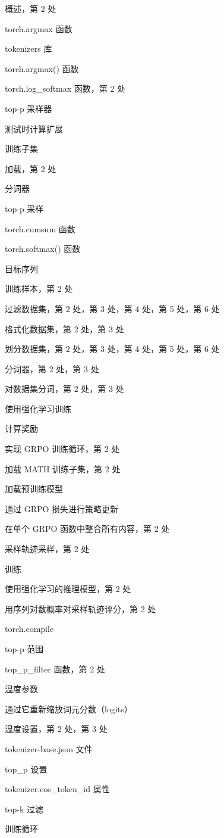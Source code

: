 概述，第 2 处

torch.argmax 函数

tokenizers 库

torch.argmax() 函数

torch.log\_softmax 函数，第 2 处

top-p 采样器

测试时计算扩展

训练子集

加载，第 2 处

分词器

top-p 采样

torch.cumsum 函数

torch.softmax() 函数

目标序列

训练样本，第 2 处

过滤数据集，第 2 处，第 3 处，第 4 处，第 5 处，第 6 处

格式化数据集，第 2 处，第 3 处

划分数据集，第 2 处，第 3 处，第 4 处，第 5 处，第 6 处

分词器，第 2 处，第 3 处

对数据集分词，第 2 处，第 3 处

使用强化学习训练

计算奖励

实现 GRPO 训练循环，第 2 处

加载 MATH 训练子集，第 2 处

加载预训练模型

通过 GRPO 损失进行策略更新

在单个 GRPO 函数中整合所有内容，第 2 处

采样轨迹采样，第 2 处

训练

使用强化学习的推理模型，第 2 处

用序列对数概率对采样轨迹评分，第 2 处

torch.compile

top-p 范围

top\_p\_filter 函数，第 2 处

温度参数

通过它重新缩放词元分数（logits）

温度设置，第 2 处，第 3 处

tokenizer-base.json 文件

top\_p 设置

tokenizer.eos\_token\_id 属性

top-k 过滤

训练循环

